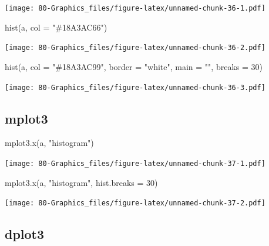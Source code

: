 \documentclass[
]{book}
\newenvironment{Shaded}{\begin{snugshade}}{\end{snugshade}}
\newcommand{\AttributeTok}[1]{\textcolor[rgb]{0.77,0.63,0.00}{#1}}
\newcommand{\DecValTok}[1]{\textcolor[rgb]{0.00,0.00,0.81}{#1}}
\newcommand{\FunctionTok}[1]{\textcolor[rgb]{0.00,0.00,0.00}{#1}}
\newcommand{\NormalTok}[1]{#1}
\newcommand{\StringTok}[1]{\textcolor[rgb]{0.31,0.60,0.02}{#1}}
\begin{document}
\texttt{[image: 80-Graphics\_files/figure-latex/unnamed-chunk-36-1.pdf]}

\begin{Shaded}
\begin{Highlighting}[]
\FunctionTok{hist}\NormalTok{(a, }\AttributeTok{col =} \StringTok{"\#18A3AC66"}\NormalTok{)}
\end{Highlighting}
\end{Shaded}

\texttt{[image: 80-Graphics\_files/figure-latex/unnamed-chunk-36-2.pdf]}

\begin{Shaded}
\begin{Highlighting}[]
\FunctionTok{hist}\NormalTok{(a, }\AttributeTok{col =} \StringTok{"\#18A3AC99"}\NormalTok{, }\AttributeTok{border =} \StringTok{"white"}\NormalTok{, }\AttributeTok{main =} \StringTok{""}\NormalTok{, }\AttributeTok{breaks =} \DecValTok{30}\NormalTok{)}
\end{Highlighting}
\end{Shaded}

\texttt{[image: 80-Graphics\_files/figure-latex/unnamed-chunk-36-3.pdf]}

\hypertarget{mplot3-3}{%
\subsection{\texorpdfstring{\textbf{mplot3}}{mplot3}}\label{mplot3-3}}

\begin{Shaded}
\begin{Highlighting}[]
\FunctionTok{mplot3.x}\NormalTok{(a, }\StringTok{"histogram"}\NormalTok{)}
\end{Highlighting}
\end{Shaded}

\texttt{[image: 80-Graphics\_files/figure-latex/unnamed-chunk-37-1.pdf]}

\begin{Shaded}
\begin{Highlighting}[]
\FunctionTok{mplot3.x}\NormalTok{(a, }\StringTok{"histogram"}\NormalTok{, }\AttributeTok{hist.breaks =} \DecValTok{30}\NormalTok{)}
\end{Highlighting}
\end{Shaded}

\texttt{[image: 80-Graphics\_files/figure-latex/unnamed-chunk-37-2.pdf]}

\hypertarget{dplot3-3}{%
\subsection{\texorpdfstring{\textbf{dplot3}}{dplot3}}\label{dplot3-3}}
\end{document}

